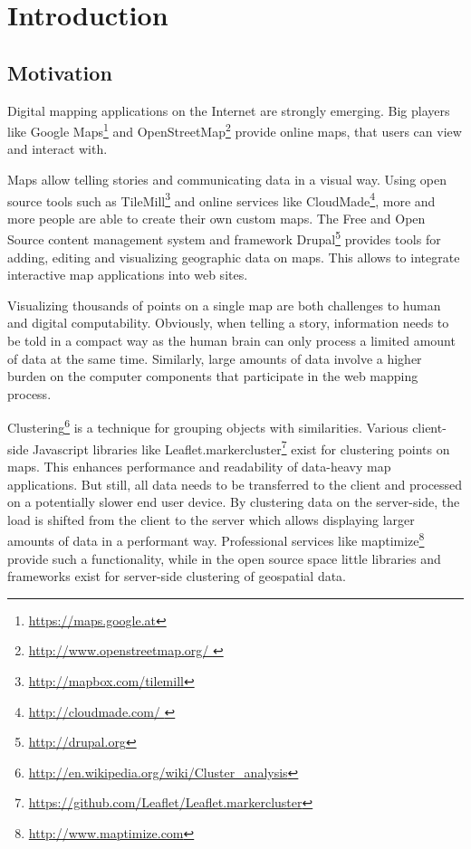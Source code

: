 
%
%

\chapter{Introduction}


\section{Motivation}

Digital mapping applications on the Internet are strongly emerging. Big players like Google Maps\footnote{\url{https://maps.google.at}} and OpenStreetMap\footnote{\url{http://www.openstreetmap.org/ }} provide online maps, that users can view and interact with. 

Maps allow telling stories and communicating data in a visual way. Using open source tools such as TileMill\footnote{\url{http://mapbox.com/tilemill}} and online services like CloudMade\footnote{\url{http://cloudmade.com/ }}, more and more people are able to create their own custom maps. The Free and Open Source content management system and framework Drupal\footnote{\url{http://drupal.org}} provides tools for adding, editing and visualizing geographic data on maps. This allows to integrate interactive map applications into web sites.

Visualizing thousands of points on a single map are both challenges to human and digital computability. Obviously, when telling a story, information needs to be told in a compact way as the human brain can only process a limited amount of data at the same time. Similarly, large amounts of data involve a higher burden on the computer components that participate in the web mapping process.

Clustering\footnote{\url{http://en.wikipedia.org/wiki/Cluster_analysis}} is a technique for grouping objects with similarities. Various client-side Javascript libraries like Leaflet.markercluster\footnote{\url{https://github.com/Leaflet/Leaflet.markercluster}} exist for clustering points on maps. This enhances performance and readability of data-heavy map applications. But still, all data needs to be transferred to the client and processed on a potentially slower end user device. By clustering data on the server-side, the load is shifted from the client to the server which allows displaying larger amounts of data in a performant way. Professional services like maptimize\footnote{\url{http://www.maptimize.com}} provide such a functionality, while in the open source space little libraries and frameworks exist for server-side clustering of geospatial data.

